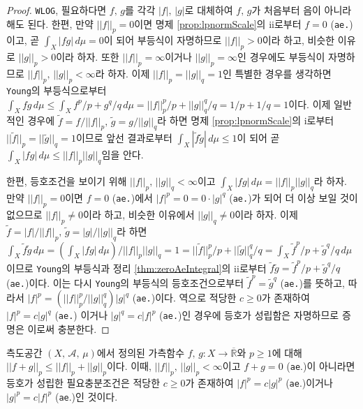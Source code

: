\begin{proof}
    \texttt{WLOG}, 필요하다면 $f,\,g$를 각각 $|f|,\,|g|$로 대체하여 $f,\,g$가 처음부터 음이 아니라 해도 된다. 한편, 만약 $||f||_p=0$이면 명제 \ref{prop:lpnormScale}의 ii로부터 $f=0$ (\texttt{ae.})이고, 곧 $\int_X|fg|\,d\mu=0$이 되어 부등식이 자명하므로 $||f||_p>0$이라 하고, 비슷한 이유로 $||g||_p>0$이라 하자. 또한 $||f||_p=\infty$이거나 $||g||_p=\infty$인 경우에도 부등식이 자명하므로 $||f||_p,\,||g||_p<\infty$라 하자. 이제 $||f||_p=||g||_q=1$인 특별한 경우를 생각하면 \texttt{Young}의 부등식으로부터 $\int_Xfg\,d\mu\leq\int_Xf^p/p+g^q/q\,d\mu=||f||_p^p/p+||g||_q^q/q=1/p+1/q=1$이다. 이제 일반적인 경우에 $\widetilde{f}=f/||f||_p,\,\widetilde{g}=g/||g||_q$라 하면 명제 \ref{prop:lpnormScale}의 i로부터 $||\widetilde{f}||_p=||\widetilde{g}||_q=1$이므로 앞선 결과로부터 $\int_X|\widetilde{f}\widetilde{g}|\,d\mu\leq1$이 되어 곧 $\int_X|fg|\,d\mu\leq||f||_p||g||_q$임을 안다.

    한편, 등호조건을 보이기 위해 $||f||_p,\,||g||_q<\infty$이고 $\int_X|fg|\,d\mu=||f||_p||g||_q$라 하자. 만약 $||f||_p=0$이면 $f=0$ (\texttt{ae.})에서 $|f|^p=0=0\cdot|g|^q$ (\texttt{ae.})가 되어 더 이상 보일 것이 없으므로 $||f||_p\ne0$이라 하고, 비슷한 이유에서 $||g||_q\ne0$이라 하자. 이제 $\widetilde{f}=|f|/||f||_p,\,\widetilde{g}=|g|/||g||_q$라 하면 $\int_X\widetilde{f}\widetilde{g}\,d\mu=(\int_X|fg|\,d\mu)/||f||_p||g||_q=1=||\widetilde{f}||_p^p/p+||\widetilde{g}||_q^q/q=\int_X\widetilde{f}^p/p+\widetilde{g}^q/q\,d\mu$이므로 \texttt{Young}의 부등식과 정리 \ref{thm:zeroAeIntegral}의 ii로부터 $\widetilde{f}\widetilde{g}=\widetilde{f}^p/p+\widetilde{g}^q/q$ (\texttt{ae.})이다. 이는 다시 \texttt{Young}의 부등식의 등호조건으로부터 $\widetilde{f}^p=\widetilde{g}^q$ (\texttt{ae.})를 뜻하고, 따라서 $|f|^p=(||f||_p^p/||g||_q^q)|g|^q$ (\texttt{ae.})이다. 역으로 적당한 $c\geq0$가 존재하여 $|f|^p=c|g|^q$ (\texttt{ae.}) 이거나 $|g|^q=c|f|^p$ (\texttt{ae.})인 경우에 등호가 성립함은 자명하므로 증명은 이로써 충분한다.
\end{proof}

\begin{theorem}
    측도공간 $(X,\,\mathcal{A},\,\mu)$에서 정의된 가측함수 $f,\,g:X\to\overline{\mathbb{R}}$와 $p\geq1$에 대해 $||f+g||_p\leq||f||_p+||g||_p$이다. 이때, $||f||_p,\,||g||_p<\infty$이고 $f+g=0$ (\texttt{ae}.)이 아니라면 등호가 성립한 필요충분조건은 적당한 $c\geq0$가 존재하여 $|f|^p=c|g|^p$ (\texttt{ae}.)이거나 $|g|^p=c|f|^p$ (\texttt{ae}.)인 것이다.
\end{theorem}

